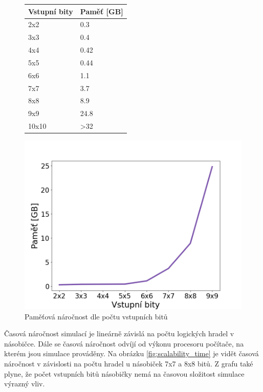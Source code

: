 \begin{figure}[H]
  \begin{minipage}[b]{.47\linewidth}
    \centering
    \begin{tabular}{|l|l|}
        \textbf{Vstupní bity} & \textbf{Paměť [GB]} \\ \hline
        2x2 & 0.3 \\ 
        3x3 & 0.4 \\ 
        4x4 & 0.42 \\ 
        5x5 & 0.44 \\ 
        6x6 & 1.1 \\ 
        7x7 & 3.7 \\ 
        8x8 & 8.9 \\ 
        9x9 & 24.8 \\ 
        10x10 & >32 \\ 
    \end{tabular}
    \label{tab:scalability_memory}
  \end{minipage}
  \begin{minipage}[b]{.47\linewidth}
    \centering
    \includegraphics[width=\linewidth]{obrazky-figures/scalability_memory.png}
    \caption{Paměťová náročnost dle počtu vstupních bitů}
    \label{fig:scalability_memory}
  \end{minipage}\hfill
\end{figure}
\pagebreak
Časová náročnost simulací je lineárně závislá na počtu logických hradel v násobičce. Dále se časová náročnost odvíjí od výkonu procesoru počítače, na kterém jsou simulace prováděny. Na obrázku \ref{fig:scalability_time} je vidět časová náročnost v závislosti na počtu hradel u násobiček 7x7 a 8x8 bitů. Z grafu také plyne, že počet vstupních bitů násobičky nemá na časovou složitost simulace výrazný vliv.

